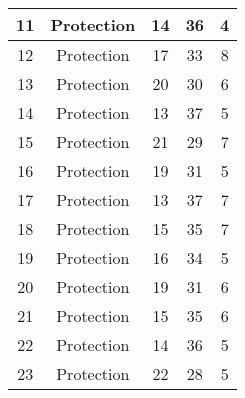 \documentclass[results.tex]{subfiles}
\begin{document}
\begin{center}
\begin{tabular}{| c || c | c | c | c |}
            \hline
            11                      & Protection                   & 14                     & 36                      & 4                    \\
            \hline
            12                      & Protection                   & 17                     & 33                      & 8                    \\
            \hline
            13                      & Protection                   & 20                     & 30                      & 6                    \\
            \hline
            14                      & Protection                   & 13                     & 37                      & 5                    \\
            \hline
            15                      & Protection                   & 21                     & 29                      & 7                    \\
            \hline
            16                      & Protection                   & 19                     & 31                      & 5                    \\
            \hline
            17                      & Protection                   & 13                     & 37                      & 7                    \\
            \hline
            18                      & Protection                   & 15                     & 35                      & 7                    \\
            \hline
            19                      & Protection                   & 16                     & 34                      & 5                    \\
            \hline
            20                      & Protection                   & 19                     & 31                      & 6                    \\
            \hline
            21                      & Protection                   & 15                     & 35                      & 6                    \\
            \hline
            22                      & Protection                   & 14                     & 36                      & 5                    \\
            \hline
            23                      & Protection                   & 22                     & 28                      & 5                    \\

\end{tabular}
\end{center}
\end{document}
